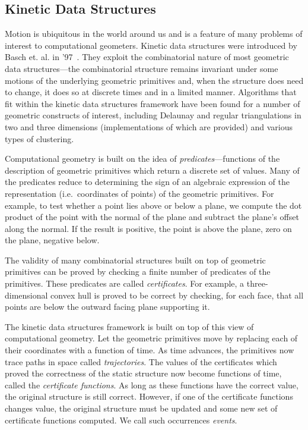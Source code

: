 \subsection{Kinetic Data Structures}
Motion is ubiquitous in the world around us and is a feature of many
problems of interest to computational geometers. Kinetic data
structures were introduced by Basch et. al. in
'97~\cite{Basch97}. They exploit the combinatorial nature of most
geometric data structures---the combinatorial structure remains
invariant under some motions of the underlying geometric primitives
and, when the structure does need to change, it does so at discrete
times and in a limited manner. Algorithms that fit within the kinetic
data structures framework have been found for a number of geometric
constructs of interest, including Delaunay and regular triangulations
in two and three dimensions (implementations of which are provided)
and various types of clustering.

Computational geometry is built on the idea of
\textit{predicates}---functions of the description of geometric
primitives which return a discrete set of values. Many of the
predicates reduce to determining the sign of an algebraic expression
of the representation (i.e.\ coordinates of points) of the geometric
primitives. For example, to test whether a point lies above or below a
plane, we compute the dot product of the point with the normal of the
plane and subtract the plane's offset along the normal. If the result
is positive, the point is above the plane, zero on the plane, negative
below.

The validity of many combinatorial structures built on top of
geometric primitives can be proved by checking a finite number of
predicates of the primitives. These predicates are called {\em
  certificates}. For example, a three-dimensional convex hull is
proved to be correct by checking, for each face, that all points are
below the outward facing plane supporting it.

The kinetic data structures framework is built on top of this view of
computational geometry. Let the geometric primitives move by replacing
each of their coordinates with a function of time. As time advances,
the primitives now trace paths in space called {\em trajectories}. The
values of the certificates which proved the correctness of the static
structure now become functions of time, called the {\em certificate
  functions}. As long as these functions have the correct value, the
original structure is still correct. However, if one of the
certificate functions changes value, the original structure must be
updated and some new set of certificate functions computed. We call
such occurrences {\em events}.

